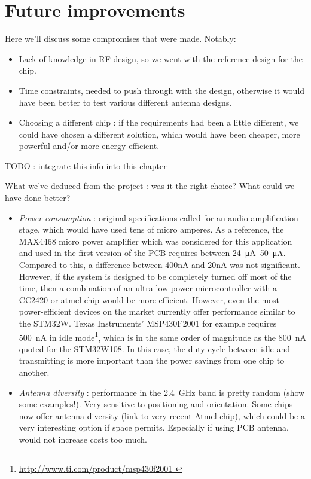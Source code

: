 \chapter{Future improvements}\label{ch:improvements}

Here we'll discuss some compromises that were made. Notably:

\begin{itemize}
  \item Lack of knowledge in RF design, so we went with the reference design for
    the chip.
  \item Time constraints, needed to push through with the design, otherwise it
    would have been better to test various different antenna designs. 
  \item Choosing a different chip : if the requirements had been a little
    different, we could have chosen a different solution, which would have been
    cheaper, more powerful and/or more energy efficient.
\end{itemize}


TODO : integrate this info into this chapter

What we've deduced from the project : was it the right choice? What could we
have done better?

\begin{itemize}
  \item \emph{Power consumption} : original specifications called for an audio
    amplification stage, which would have used tens of micro amperes. As
    a reference, the MAX4468 micro power amplifier which was considered for this
    application and used in the first version of the PCB requires between
    \SIrange{24}{50}{\micro\ampere}. Compared to this, a difference between
    400nA and 20nA was not significant. However, if the system is designed to be
    completely turned off most of the time, then a combination of an ultra low
    power microcontroller with a CC2420 or atmel chip would be more efficient.
    However, even the most power-efficient devices on the market currently offer
    performance similar to the STM32W. Texas Instruments' MSP430F2001 for
    example requires \SI{500}{nA} in idle mode\footnote{ \url{
    http://www.ti.com/product/msp430f2001 }}, which is in the same order of
    magnitude as the \SI{800}{nA} quoted for the STM32W108. In this case, the
    duty cycle between idle and transmitting is more important than the power
    savings from one chip to another.
  \item \emph{Antenna diversity} : performance in the \SI{2.4}{GHz} band is pretty
    random (show some examples!). Very sensitive to positioning and orientation.
    Some chips now offer antenna diversity (link to very recent Atmel chip),
    which could be a very interesting option if space permits. Especially if
    using PCB antenna, would not increase costs too much.
\end{itemize}



